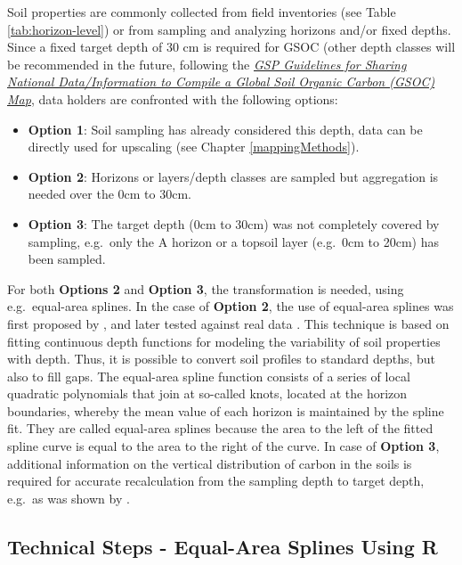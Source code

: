 \documentclass[10pt,b5paper,]{book}
\providecommand{\tightlist}{%
  \setlength{\itemsep}{0pt}\setlength{\parskip}{0pt}}
\theoremstyle{definition}
\theoremstyle{definition}
\theoremstyle{definition}
\theoremstyle{remark}
\begin{document}
Soil properties are commonly collected from field inventories (see Table
\ref{tab:horizon-level}) or from sampling and analyzing horizons and/or
fixed depths. Since a fixed target depth of 30 cm is required for GSOC
(other depth classes will be recommended in the future, following the
\href{http://www.fao.org/3/a-bp164e.pdf}{\emph{GSP Guidelines for
Sharing National Data/Information to Compile a Global Soil Organic
Carbon (GSOC) Map}}, data holders are confronted with the following
options:

\begin{itemize}
\tightlist
\item
  \textbf{Option 1}: Soil sampling has already considered this depth,
  data can be directly used for upscaling (see Chapter
  \ref{mappingMethods}).
\item
  \textbf{Option 2}: Horizons or layers/depth classes are sampled but
  aggregation is needed over the 0cm to 30cm.
\item
  \textbf{Option 3}: The target depth (0cm to 30cm) was not completely
  covered by sampling, e.g.~only the A horizon or a topsoil layer
  (e.g.~0cm to 20cm) has been sampled.
\end{itemize}

For both \textbf{Options 2} and \textbf{Option 3}, the transformation is
needed, using e.g.~equal-area splines. In the case of \textbf{Option 2},
the use of equal-area splines was first proposed by
\cite{ponce1986improved}, and later tested against real data
\citep{bishop1999modelling}. This technique is based on fitting
continuous depth functions for modeling the variability of soil
properties with depth. Thus, it is possible to convert soil profiles to
standard depths, but also to fill gaps. The equal-area spline function
consists of a series of local quadratic polynomials that join at
so-called knots, located at the horizon boundaries, whereby the mean
value of each horizon is maintained by the spline fit. They are called
equal-area splines because the area to the left of the fitted spline
curve is equal to the area to the right of the curve. In case of
\textbf{Option 3}, additional information on the vertical distribution
of carbon in the soils is required for accurate recalculation from the
sampling depth to target depth, e.g.~as was shown by
\cite{bernoux1998modeling}.

\hypertarget{EqualAreaSplines}{%
\subsection{Technical Steps - Equal-Area Splines Using
R}\label{EqualAreaSplines}}
\end{document}

